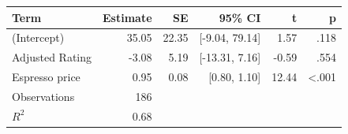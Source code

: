 \begin{tabular}{lrrrrr}
\toprule
Term & Estimate & SE & 95\% CI & t & p \\
\midrule
(Intercept) & 35.05 & 22.35 & [-9.04, 79.14] & 1.57 & .118 \\
Adjusted Rating & -3.08 & 5.19 & [-13.31, 7.16] & -0.59 & .554 \\
Espresso price & 0.95 & 0.08 & [0.80, 1.10] & 12.44 & <.001 \\
Observations & 186 &  &  &  &  \\
$R^2$ & 0.68 &  &  &  &  \\
\bottomrule
\end{tabular}
